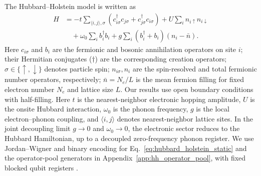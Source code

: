 \documentclass[
  reprint,
  amsmath,
  amssymb,
  aps,
  pra,
  nofootinbib,
  superscriptaddress,
  floatfix
]{revtex4-2}
\begin{document}
The Hubbard--Holstein model \cite{ClayHardikar2005HH,Tezuka2007HH} is written as
\begin{align}
H
&=-t\sum_{\langle i,j\rangle,\sigma}
(c_{i\sigma}^{\dagger}c_{j\sigma}+c_{j\sigma}^{\dagger}c_{i\sigma})
+U\sum_i n_{i\uparrow}n_{i\downarrow}
\nonumber\\
&\quad+\omega_0\sum_i b_i^\dagger b_i
+g\sum_i(b_i^\dagger+b_i)(n_i-\bar n).
\label{eq:hubbard_holstein_static}
\end{align}
Here \(c_{i\sigma}\) and \(b_i\) are the fermionic and bosonic annihilation operators on site \(i\); their Hermitian conjugates (\(\dagger\)) are the corresponding creation operators; \(\sigma \in\{\uparrow, \downarrow\}\) denotes particle spin;
\(n_{i\sigma}, n_i\) are the spin-resolved and total fermionic number operators, respectively; \(\bar n=N_e/L\) is the mean fermion filling for fixed electron number \(N_e\) and lattice size \(L\). Our results use open boundary conditions with half-filling. Here \(t\) is the nearest-neighbor electronic hopping amplitude, \(U\) is the onsite Hubbard interaction, \(\omega_0\) is the phonon frequency, \(g\) is the local electron--phonon coupling, and \(\langle i,j\rangle\) denotes nearest-neighbor lattice sites.
In the joint decoupling limit $g\to0$ and $\omega_0\to0$, the electronic sector reduces to the Hubbard Hamiltonian, up to a decoupled zero-frequency phonon register. We use Jordan--Wigner and binary encoding for Eq.~\eqref{eq:hubbard_holstein_static} and the operator-pool generators in Appendix~\ref{app:hh_operator_pool}, with fixed blocked qubit registers \cite{Sawaya2020,Peng2025BosonHamiltonians}.
\end{document}
